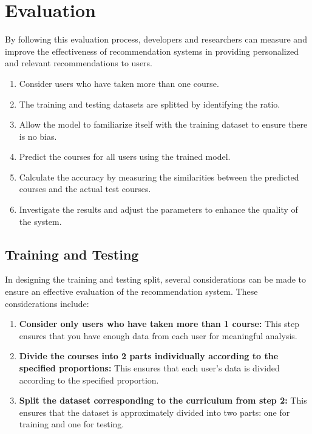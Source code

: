 \newpage

\section{Evaluation}

By following this evaluation process, developers and researchers can measure and improve the 
effectiveness of recommendation systems in providing personalized and relevant recommendations to users.

\begin{enumerate}
    \item \textsf{Consider users who have taken more than one course.}
    \item \textsf{The training and testing datasets are splitted by identifying the ratio.}
    \item \textsf{Allow the model to familiarize itself with the training dataset to ensure there is no bias.}
    \item \textsf{Predict the courses for all users using the trained model.}
    \item \textsf{Calculate the accuracy by measuring the similarities between the predicted courses and the actual test courses.}
    \item \textsf{Investigate the results and adjust the parameters to enhance the quality of the system.}
\end{enumerate}

\subsection{Training and Testing}

In designing the training and testing split, several considerations can be made to ensure an effective 
evaluation of the recommendation system. These considerations include:

\begin{enumerate}
    \item \textsf{\textbf{Consider only users who have taken more than 1 course: }
    This step ensures that you have enough data from each user for meaningful analysis.}
    \item \textsf{\textbf{Divide the courses into 2 parts individually according to the specified proportions: }
    This ensures that each user's data is divided according to the specified proportion.}
    \item \textsf{\textbf{Split the dataset corresponding to the curriculum from step 2: }
        This ensures that the dataset is approximately divided into two parts: one for training and one for testing.}
\end{enumerate}


